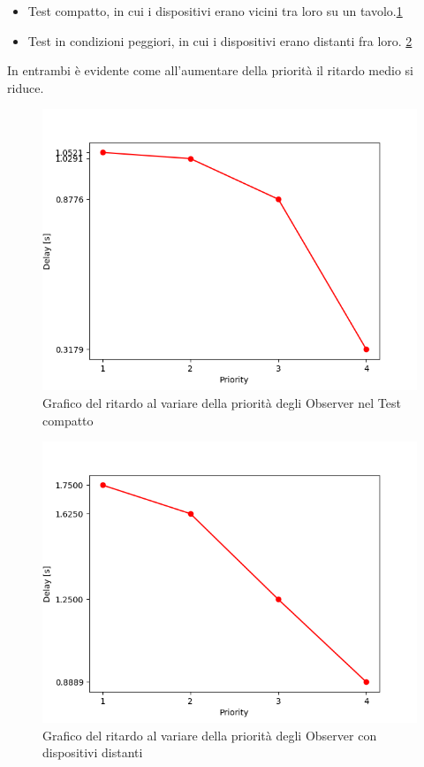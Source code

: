     \begin{itemize}
      \item Test compatto, in cui i dispositivi erano vicini tra loro su un tavolo.\ref{fig:graficoRitardoLibero}
      \item Test in condizioni peggiori, in cui i dispositivi erano distanti fra loro. \ref{fig:graficoRitardoDisturbato}
    \end{itemize}
    In entrambi è evidente come all'aumentare della priorità il ritardo medio si riduce.
    \begin{figure}
      \centering
      \includegraphics[scale = 0.75]{../Immagini/GraficoRitardoLibero.png}
      \caption{Grafico del ritardo al variare della priorità degli Observer nel Test compatto}
      \label{fig:graficoRitardoLibero}
    \end{figure}
    \begin{figure}
      \centering
      \includegraphics[scale = 0.75]{../Immagini/GraficoRitardoDisturbato.png}
      \caption{Grafico del ritardo al variare della priorità degli Observer con dispositivi distanti}
      \label{fig:graficoRitardoDisturbato}
    \end{figure}

    

    

    
